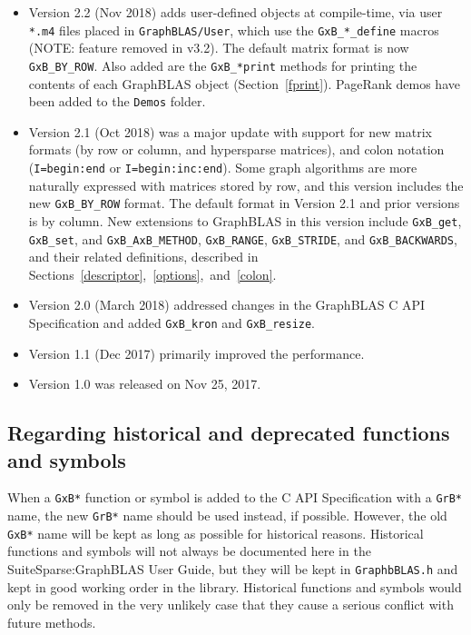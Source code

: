 \documentclass[12pt]{article}
\begin{document}
\begin{itemize}
\item
Version 2.2 (Nov 2018)
adds user-defined objects at compile-time, via user \verb'*.m4' files placed in
\verb'GraphBLAS/User', which use the \verb'GxB_*_define' macros
(NOTE: feature removed in v3.2).
The default matrix format is now \verb'GxB_BY_ROW'.
Also added are the \verb'GxB_*print' methods for printing the contents of each
GraphBLAS object (Section~\ref{fprint}).   PageRank demos have been added to
the \verb'Demos' folder.

\item
Version 2.1 (Oct 2018) was
a major update with support for new matrix formats
(by row or column, and hypersparse matrices), and colon notation
(\verb'I=begin:end' or \verb'I=begin:inc:end').  Some graph algorithms are more
naturally expressed with matrices stored by row, and this version includes the
new \verb'GxB_BY_ROW' format.  The default format in Version 2.1 and
prior versions is by column.
New extensions to GraphBLAS in this version include \verb'GxB_get',
\verb'GxB_set', and \verb'GxB_AxB_METHOD', \verb'GxB_RANGE', \verb'GxB_STRIDE',
and \verb'GxB_BACKWARDS', and their related definitions, described in
Sections~\ref{descriptor},~\ref{options},~and~\ref{colon}.

\item
Version 2.0 (March 2018) addressed changes in the GraphBLAS C API
Specification and added \verb'GxB_kron' and \verb'GxB_resize'.

\item
Version 1.1 (Dec 2017) primarily improved the performance.

\item
Version 1.0 was released on Nov 25, 2017.
\end{itemize}

\subsection{Regarding historical and deprecated functions and symbols}

When a \verb'GxB*' function or symbol is added to the C API Specification with
a \verb'GrB*' name, the new \verb'GrB*' name should be used instead, if
possible.  However, the old \verb'GxB*' name will be kept as long as possible
for historical reasons.  Historical functions and symbols will not always be
documented here in the SuiteSparse:GraphBLAS User Guide, but they will be kept
in \verb'GraphbBLAS.h' and kept in good working order in the library.
Historical functions and symbols would only be removed in the very unlikely
case that they cause a serious conflict with future methods.
\end{document}
